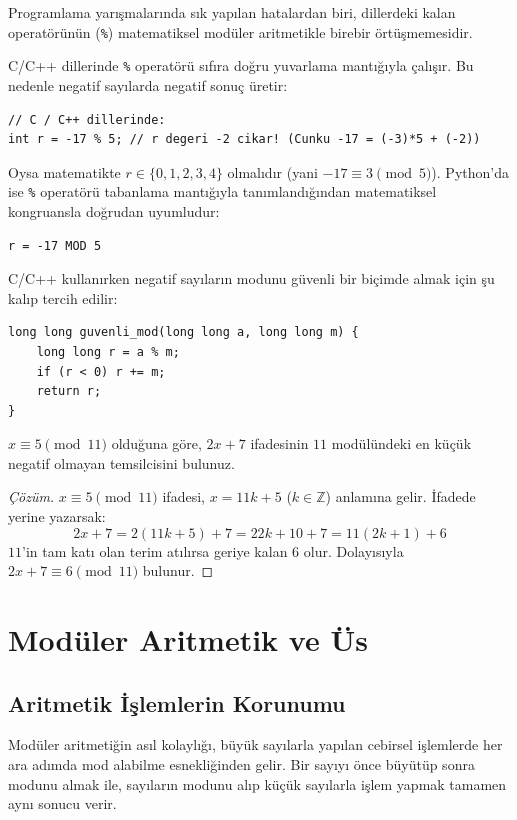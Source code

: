 Programlama yarışmalarında sık yapılan hatalardan biri, dillerdeki kalan operatörünün (\texttt{\%}) matematiksel modüler aritmetikle birebir örtüşmemesidir.

C/C++ dillerinde \texttt{\%} operatörü sıfıra doğru yuvarlama mantığıyla çalışır. Bu nedenle negatif sayılarda negatif sonuç üretir:
\begin{lstlisting}[language=CTemel]
// C / C++ dillerinde:
int r = -17 % 5; // r degeri -2 cikar! (Cunku -17 = (-3)*5 + (-2))
\end{lstlisting}
Oysa matematikte $r \in \{0, 1, 2, 3, 4\}$ olmalıdır (yani $-17 \equiv 3 \pmod 5$). Python'da ise \texttt{\%} operatörü tabanlama mantığıyla tanımlandığından matematiksel kongruansla doğrudan uyumludur:
\begin{lstlisting}
r = -17 MOD 5\end{lstlisting}

C/C++ kullanırken negatif sayıların modunu güvenli bir biçimde almak için şu kalıp tercih edilir:
\begin{lstlisting}[language=CTemel]
long long guvenli_mod(long long a, long long m) {
    long long r = a % m;
    if (r < 0) r += m;
    return r;
}
\end{lstlisting}

\begin{example}
$x \equiv 5 \pmod{11}$ olduğuna göre, $2x + 7$ ifadesinin $11$ modülündeki en küçük negatif olmayan temsilcisini bulunuz.
\end{example}

\begin{proof}[Çözüm]
$x \equiv 5 \pmod{11}$ ifadesi, $x = 11k + 5$ ($k \in \mathbb{Z}$) anlamına gelir. İfadede yerine yazarsak:
\[
2x + 7 = 2(11k + 5) + 7 = 22k + 10 + 7 = 11(2k + 1) + 6
\]
$11$'in tam katı olan terim atılırsa geriye kalan $6$ olur. Dolayısıyla $2x + 7 \equiv 6 \pmod{11}$ bulunur.
\end{proof}

\section{Modüler Aritmetik ve Üs}

\subsection{Aritmetik İşlemlerin Korunumu}

Modüler aritmetiğin asıl kolaylığı, büyük sayılarla yapılan cebirsel işlemlerde her ara adımda mod alabilme esnekliğinden gelir. Bir sayıyı önce büyütüp sonra modunu almak ile, sayıların modunu alıp küçük sayılarla işlem yapmak tamamen aynı sonucu verir.

